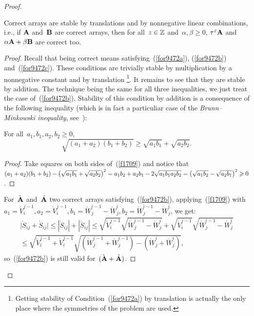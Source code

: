 \begin{proof}
\begin{Lem}\label{lem0513}
Correct arrays are stable by translations and by nonnegative linear combinations,
i.e., if $\mathbf{A}$ and~$\mathbf{B}$ are correct arrays,
then for all~$z\in\mathbb{Z}$ and~$\alpha,\beta \geq 0$,
$\tau^z\mathbf{A}$ and~$\alpha\mathbf{A} + \beta\mathbf{B}$
are correct too.
\end{Lem}

\begingroup{}\begin{proof}
Recall that being correct means satisfying~(\ref{for9472a}), (\ref{for9472b}) and~(\ref{for9472c}).
These conditions are trivially stable by multiplication by a nonnegative constant
and by translation%
\footnote{Getting stability of Condition~(\ref{for9472a}) by translation
is actually the only place where the symmetries of the problem are used.}.
It remains to see that they are stable by addition.
The technique being the same for all three inequalities,
we just treat the case of~(\ref{for9472b}).
%
Stability of this condition by addition is a consequence of the following inequality
(which is in fact a particuliar case of the \emph{Brunn--Minkowski inequality},
see~\cite{B-M_inequality}):
%
\begin{Lem}\label{lem0514} For all~$a_1, b_1, a_2, b_2 \geq 0$,
\[\label{f1709} \sqrt{(a_1+a_2)(b_1+b_2)} \geq \sqrt{a_1b_1} + \sqrt{a_2b_2} .\]
\end{Lem}
%
\begingroup\def\proofname{Proof of Lemma~\ref{lem0514}}\begin{proof}
Take squares on both sides of~(\ref{f1709})
and notice that ${(a_1+a_2)}\ab {(b_1+b_2)} \ab - {\big(\sqrt{a_1b_1} + \sqrt{a_2b_2}\big)^2}
\ab = a_1b_2 + a_2b_1 - 2\sqrt{a_1b_1a_2b_2} \ab =
{\big(\sqrt{a_1b_2} - \sqrt{a_2b_1}\big)^2} \ab \geq 0$.
\end{proof}\endgroup

For~$\grave{\mbf{A}}$ and~$\acute{\mbf{A}}$ two correct arrays satisfying~(\ref{for9472b}),
applying~(\ref{f1709}) with ${a_1 = \acute{V}^{j-1}_i}, a_2 = \grave{V}^{j-1}_i,
b_1 = \acute{W}^{i-1}_j - \acute{W}^i_j, b_2 = \grave{W}^{i-1}_j - \grave{W}^i_j$,
we get:
\begin{multline} \big|\grave{S}_{ij}+\acute{S}_{ij}\big| \leq
|\grave{S}_{ij}| + |\acute{S}_{ij}| \leq
\sqrt{\grave{V}_i^{j-1}}\sqrt{\grave{W}_j^{i-1}-\grave{W}_j^i}
+ \sqrt{\acute{V}_i^{j-1}}\sqrt{\acute{W}_j^{i-1}-\acute{W}_j^i} \\
\leq \sqrt{\grave{V}_i^{j-1}+\acute{V}_i^{j-1}}
\sqrt{(\grave{W}_j^{i-1}+\acute{W}_j^{i-1}) - (\grave{W}_j^i+\acute{W}_j^i)} ,
\end{multline}
so~(\ref{for9472b}) is still valid for~$(\grave{\mbf{A}}+\acute{\mbf{A}})$.
\end{proof}\endgroup


\end{proof}
